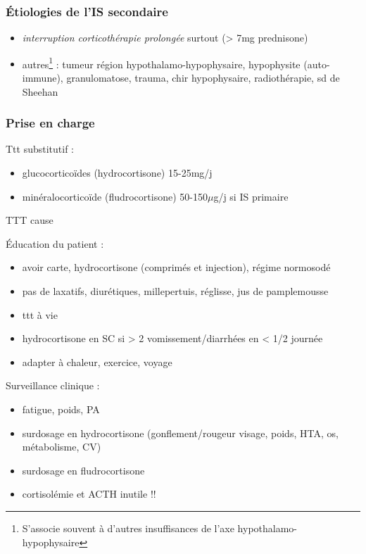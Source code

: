 \documentclass[11pt]{article}
\begin{document}
\subsubsection{Étiologies de l'IS secondaire}
\label{sec:org6c22878}
\begin{itemize}
\item \emph{interruption corticothérapie prolongée} surtout (> 7mg prednisone)
\item autres\footnote{S'associe souvent à d'autres insuffisances de l'axe hypothalamo-hypophysaire} : tumeur région hypothalamo-hypophysaire, hypophysite (auto-immune),
granulomatose, trauma, chir hypophysaire, radiothérapie, sd de Sheehan
\end{itemize}

\subsubsection{Prise en charge}
\label{sec:org5b17163}
Ttt substitutif :
\begin{itemize}
\item glucocorticoïdes (hydrocortisone) 15-25mg/j
\item minéralocorticoïde (fludrocortisone) 50-150\(\mu\)g/j si IS primaire
\end{itemize}

TTT cause

Éducation du patient : 
\begin{itemize}
\item avoir carte, hydrocortisone (comprimés et injection), régime normosodé
\item pas de laxatifs, diurétiques, millepertuis, réglisse, jus de pamplemousse
\item ttt à vie
\item hydrocortisone en SC si > 2 vomissement/diarrhées en < 1/2 journée
\item adapter à chaleur, exercice, voyage
\end{itemize}

Surveillance clinique :
\begin{itemize}
\item fatigue, poids, PA
\item surdosage en hydrocortisone (gonflement/rougeur visage, \inc poids, HTA, os,
métabolisme, CV)
\item surdosage en fludrocortisone
\item cortisolémie et ACTH inutile !!
\end{itemize}
\end{document}

